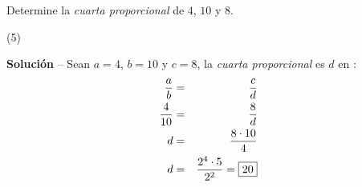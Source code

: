 \item{Determine la \textit{cuarta proporcional} de $4$, $10$ y $8$.
	\begin{tasks}(5)
	\end{tasks}
	\noindent \textbf{Solución} -- {\small Sean $a = 4$, $b = 10$ y $c = 8$, la \textit{cuarta proporcional} es $d$ en} :
	\begin{eqnarray*}
		\dfrac{a}{b} &=& \dfrac{c}{d} \\
		\dfrac{4}{10} &=& \dfrac{8}{d} \\
		d &=& \dfrac{8 \cdot 10}{4} \\
		d &=& \dfrac{2^4 \cdot 5}{2^2} = \fbox{20} 
	\end{eqnarray*}
}